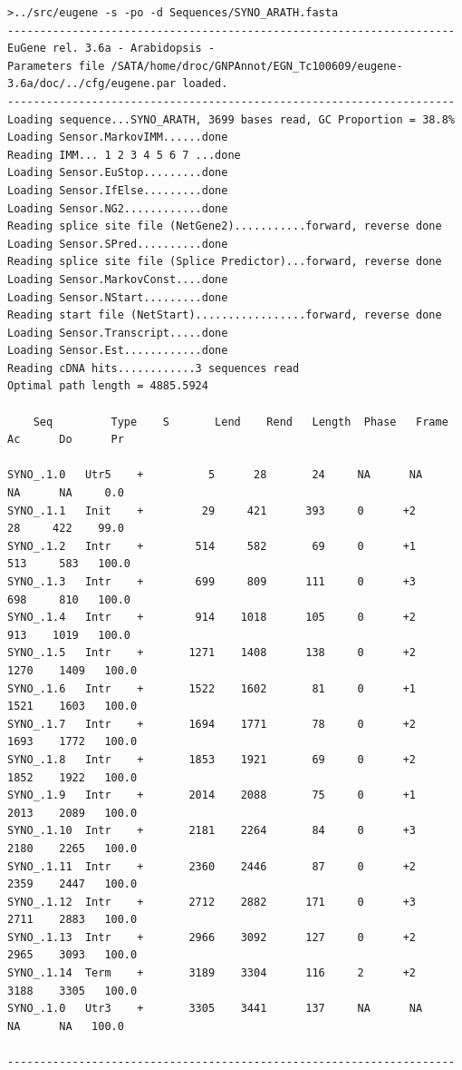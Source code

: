 \documentclass[a4paper,titlepage]{report}
\begin{document}
\begin{Verbatim}[fontsize=\scriptsize]
>../src/eugene -s -po -d Sequences/SYNO_ARATH.fasta
---------------------------------------------------------------------
EuGene rel. 3.6a - Arabidopsis -
Parameters file /SATA/home/droc/GNPAnnot/EGN_Tc100609/eugene-3.6a/doc/../cfg/eugene.par loaded.
---------------------------------------------------------------------
Loading sequence...SYNO_ARATH, 3699 bases read, GC Proportion = 38.8%
Loading Sensor.MarkovIMM......done
Reading IMM... 1 2 3 4 5 6 7 ...done
Loading Sensor.EuStop.........done
Loading Sensor.IfElse.........done
Loading Sensor.NG2............done
Reading splice site file (NetGene2)...........forward, reverse done
Loading Sensor.SPred..........done
Reading splice site file (Splice Predictor)...forward, reverse done
Loading Sensor.MarkovConst....done
Loading Sensor.NStart.........done
Reading start file (NetStart).................forward, reverse done
Loading Sensor.Transcript.....done
Loading Sensor.Est............done
Reading cDNA hits............3 sequences read
Optimal path length = 4885.5924

    Seq         Type    S       Lend    Rend   Length  Phase   Frame      Ac      Do      Pr

SYNO_.1.0	Utr5    +          5      28       24     NA      NA      NA      NA     0.0  
SYNO_.1.1	Init    +         29     421      393     0      +2      28     422    99.0  
SYNO_.1.2	Intr    +        514     582       69     0      +1     513     583   100.0  
SYNO_.1.3	Intr    +        699     809      111     0      +3     698     810   100.0  
SYNO_.1.4	Intr    +        914    1018      105     0      +2     913    1019   100.0  
SYNO_.1.5	Intr    +       1271    1408      138     0      +2    1270    1409   100.0  
SYNO_.1.6	Intr    +       1522    1602       81     0      +1    1521    1603   100.0  
SYNO_.1.7	Intr    +       1694    1771       78     0      +2    1693    1772   100.0  
SYNO_.1.8	Intr    +       1853    1921       69     0      +2    1852    1922   100.0  
SYNO_.1.9	Intr    +       2014    2088       75     0      +1    2013    2089   100.0  
SYNO_.1.10	Intr    +       2181    2264       84     0      +3    2180    2265   100.0  
SYNO_.1.11	Intr    +       2360    2446       87     0      +2    2359    2447   100.0  
SYNO_.1.12	Intr    +       2712    2882      171     0      +3    2711    2883   100.0  
SYNO_.1.13	Intr    +       2966    3092      127     0      +2    2965    3093   100.0  
SYNO_.1.14	Term    +       3189    3304      116     2      +2    3188    3305   100.0  
SYNO_.1.0	Utr3    +       3305    3441      137     NA      NA      NA      NA   100.0  

---------------------------------------------------------------------
 
\end{Verbatim}
\end{document}
